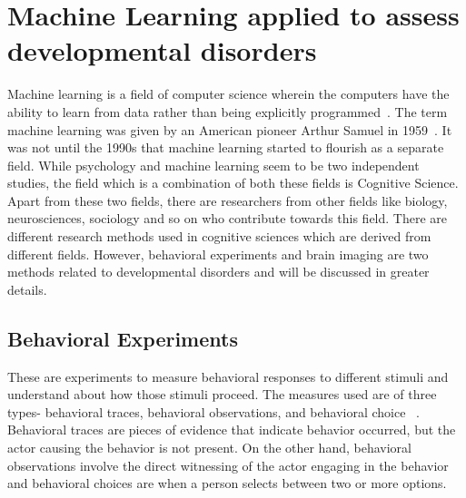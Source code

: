 \section{Machine Learning applied to assess developmental disorders}
Machine learning is a field of computer science wherein the computers have the ability to learn from data rather than being explicitly programmed~\cite{samuel1959some}. The term machine learning was given by an American pioneer Arthur Samuel in 1959~\cite{kohavi1998glossary}. It was not until the 1990s that machine learning started to flourish as a separate field. While psychology and machine learning seem to be two independent studies, the field which is a combination of both these fields is Cognitive Science. Apart from these two fields, there are researchers from other fields like biology, neurosciences, sociology and so on who contribute towards this field. There are different research methods used  in cognitive sciences which are derived from different fields. However, behavioral experiments and brain imaging are two methods related to developmental disorders and will be discussed in greater details.
\subsection{Behavioral Experiments}
These are experiments to measure behavioral responses to different stimuli and understand about how those stimuli proceed. The measures used are of three types- behavioral traces, behavioral observations, and behavioral choice ~\cite{lewandowski2009actions}. Behavioral traces are pieces of evidence that indicate behavior occurred, but the actor causing the behavior is not present. On the other hand, behavioral observations involve the direct witnessing of the actor engaging in the behavior and behavioral choices are when a person selects between two or more options.

